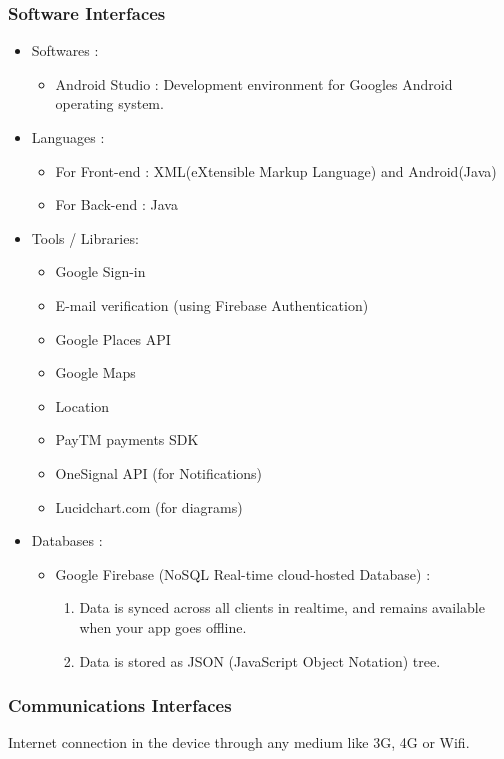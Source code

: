 \documentclass{report}
\begin{document}
\subsubsection{Software Interfaces}
\begin{itemize}[label=$\diamond$]
\item Softwares :
\begin{itemize}[label=$\rightarrow$]
\item Android Studio : Development environment for Google\textquotesingle s Android operating system.
\end{itemize}
\item Languages :
\begin{itemize}[label=$\rightarrow$]
\item For Front-end : XML(eXtensible Markup Language) and Android(Java)
\item For Back-end : Java
\end{itemize}

\item Tools / Libraries:
\begin{itemize}[label=$\rightarrow$]
\item Google Sign-in
\item E-mail verification (using Firebase Authentication)
\item Google Places API
\item Google Maps
\item Location
\item PayTM payments SDK
\item OneSignal API (for Notifications)
\item Lucidchart.com (for diagrams)
\end{itemize}

\item Databases :
\begin{itemize}[label=$\rightarrow$]
\item Google Firebase (NoSQL Real-time cloud-hosted Database) :
\begin{enumerate}
\item Data is synced across all clients in realtime, and remains available when your app goes offline.
\item Data is stored as JSON (JavaScript Object Notation) tree.
\end{enumerate}
\end{itemize}

\end{itemize}

\subsubsection{Communications Interfaces}
Internet connection in the device through any medium like 3G, 4G or Wifi.
\end{document}
